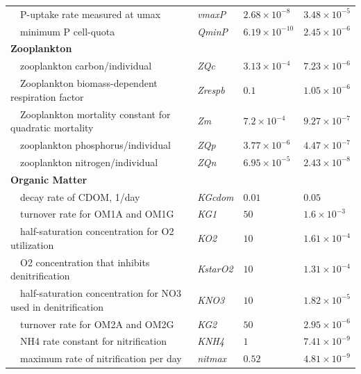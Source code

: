 \documentclass[letterpaper,12pt,oneside]{article}\usepackage[]{graphicx}\usepackage[]{color}
\begin{document}
\begin{table}[!tbp]
{\begin{center}
\begin{tabular}{llll}
~~P-uptake rate measured at umax&\textit{vmaxP}&$2.68\times 10^{-8}$&$3.48\times 10^{-5}$\tabularnewline
~~minimum P cell-quota&\textit{QminP}&$6.19\times 10^{-10}$&$2.45\times 10^{-6}$\tabularnewline
\hline
{\bfseries Zooplankton}&&&\tabularnewline
~~zooplankton carbon/individual&\textit{ZQc}&$3.13\times 10^{-4}$&$7.23\times 10^{-6}$\tabularnewline
~~Zooplankton biomass-dependent respiration factor&\textit{Zrespb}&$0.1$&$1.05\times 10^{-6}$\tabularnewline
~~Zooplankton mortality constant for quadratic mortality&\textit{Zm}&$7.2\times 10^{-4}$&$9.27\times 10^{-7}$\tabularnewline
~~zooplankton phosphorus/individual&\textit{ZQp}&$3.77\times 10^{-6}$&$4.47\times 10^{-7}$\tabularnewline
~~zooplankton nitrogen/individual&\textit{ZQn}&$6.95\times 10^{-5}$&$2.43\times 10^{-8}$\tabularnewline
\hline
{\bfseries Organic Matter}&&&\tabularnewline
~~decay rate of CDOM, 1/day&\textit{KGcdom}&$0.01$&$0.05$\tabularnewline
~~turnover rate for OM1A and OM1G&\textit{KG1}&$50$&$1.6\times 10^{-3}$\tabularnewline
~~half-saturation concentration for O2 utilization&\textit{KO2}&$10$&$1.61\times 10^{-4}$\tabularnewline
~~O2 concentration that inhibits denitrification&\textit{KstarO2}&$10$&$1.31\times 10^{-4}$\tabularnewline
~~half-saturation concentration for NO3 used in denitrification&\textit{KNO3}&$10$&$1.82\times 10^{-5}$\tabularnewline
~~turnover rate for OM2A and OM2G&\textit{KG2}&$50$&$2.95\times 10^{-6}$\tabularnewline
~~NH4 rate constant for nitrification&\textit{KNH4}&$1$&$7.41\times 10^{-9}$\tabularnewline
~~maximum rate of nitrification per day&\textit{nitmax}&$0.52$&$4.81\times 10^{-9}$\tabularnewline
\hline
\end{tabular}\end{center}}

\end{table}
\end{document}
